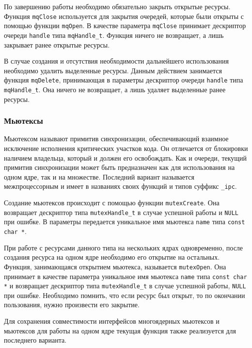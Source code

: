 По завершению работы необходимо обязательно закрыть открытые ресурсы. Функция \lstinline{mqClose} используется для закрытия очередей, которые были открыты с помощью функции
\lstinline{mqOpen}. В качестве параметра \lstinline{mqClose} принимает дескриптор очереди \lstinline{handle} типа \lstinline{mqHandle_t}. Функция ничего не возвращает, а лишь закрывает ранее
открытые ресурсы.

В случае создания и отсутствия необходимости дальнейшего использования необходимо
удалить выделенные ресурсы. Данным действием занимается функция \lstinline{mqDelete}, принимающая в параметры дескриптор очереди \lstinline{handle} типа \lstinline{mqHandle_t}. Она ничего не возвращает, а лишь удаляет выделенные ранее ресурсы.

\subsubsection{Мьютексы}

Мьютексом называют примитив синхронизации, обеспечивающий взаимное исключение исполнения критических участков кода. Он отличается от блокировки наличием владельца, который и должен его освобождать.
Как и очереди, текущий примитив синхронизации может быть предназначен как для
использования на одном ядре, так и на множестве. Последний вариант называется
межпроцессорным и имеет в названиях своих функций и типов суффикс \lstinline{_ipc}.

Создание мьютексов происходит с помощью функции \lstinline{mutexCreate}. Она возвращает дескриптор типа \lstinline{mutexHandle_t} в случае успешной работы и \lstinline{NULL}
при ошибке. В параметры передается уникальное имя мьютекса \lstinline{name} типа \lstinline{const char *}.

При работе с ресурсами данного типа на нескольких ядрах одновременно, после создания ресурса на одном ядре необходимо его открытие на остальных. Функция, занимающаяся открытием мьютекса, называется \lstinline{mutexOpen}. Она принимает в качестве параметра
уникальное имя мьютекса \lstinline{name} типа \lstinline{const char *} и возвращает дескриптор типа \lstinline{mutexHandle_t} в случае успешной работы, \lstinline{NULL} при ошибке.
Необходимо помнить, что если ресурс был открыт, то по окончании пользования, нужно произвести его закрытие.

Для сохранения совместимости интерфейсов многоядерных мьютексов и мьютексов
для работы на одном ядре текущая функция также реализуется для последнего варианта.

